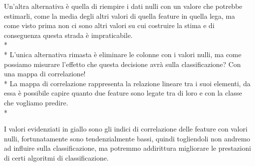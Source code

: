Un'altra alternativa è quella di riempire i dati nulli con un valore che potrebbe estimarli, come la media degli altri valori di quella feature in quella lega, ma come visto prima non ci sono altri valori su cui costruire la stima e di conseguenza questa strada è impraticabile.\\*\\*
L’unica alternativa rimasta è eliminare le colonne con i valori nulli, ma come possiamo misurare l'effetto che questa decisione avrà sulla classificazione? Con una mappa di correlazione!\\*
La mappa di correlazione rappresenta la relazione lineare tra i suoi elementi, da essa è possibile capire quanto due feature sono legate tra di loro e con la classe che vogliamo predire.\\*
\begin{figure}[htp]
\end{figure}
\par
I valori evidenziati in giallo sono gli indici di correlazione delle feature con valori nulli, fortunatamente sono tendenzialmente bassi, quindi togliendoli non andremo ad influire sulla classificazione, ma potremmo addirittura migliorare le prestazioni di certi algoritmi di classificazione.
\clearpage

